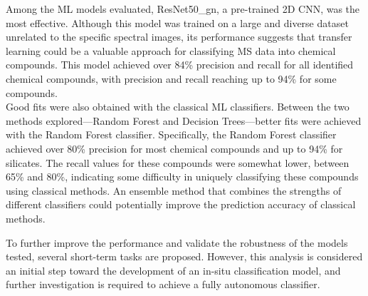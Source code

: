 Among the ML models evaluated, ResNet50\_gn, a pre-trained 2D CNN, was the most effective. Although this model was trained on a large and diverse dataset unrelated to the specific spectral images, its performance suggests that transfer learning could be a valuable approach for classifying MS data into chemical compounds. This model achieved over 84\% precision and recall for all identified chemical compounds, with precision and recall reaching up to 94\% for some compounds. \\ Good fits were also obtained with the classical ML classifiers. Between the two methods explored—Random Forest and Decision Trees—better fits were achieved with the Random Forest classifier. Specifically, the Random Forest classifier achieved over 80\% precision for most chemical compounds and up to 94\% for silicates. The recall values for these compounds were somewhat lower, between 65\% and 80\%, indicating some difficulty in uniquely classifying these compounds using classical methods. An ensemble method that combines the strengths of different classifiers could potentially improve the prediction accuracy of classical methods.

To further improve the performance and validate the robustness of the models tested, several short-term tasks are proposed. However, this analysis is considered an initial step toward the development of an in-situ classification model, and further investigation is required to achieve a fully autonomous classifier.